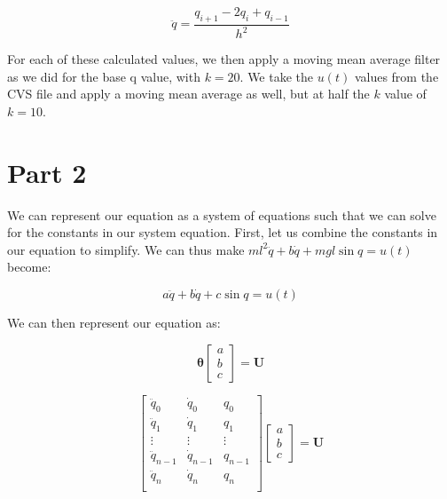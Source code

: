 \documentclass{article}
\begin{document}
\begin{equation}
    \ddot{q} = \frac{q_{i+1}-2q_i+q_{i-1}}{h^2}
\end{equation}

For each of these calculated values, we then apply a moving mean average filter as we did for the base q value, with $k=20$. We take the $u(t)$ values from the CVS file and apply a moving mean average as well, but at half the $k$ value of $k=10$.

\section*{Part 2}

We can represent our equation as a system of equations such that we can solve for the constants in our system equation. First, let us combine the constants in our equation to simplify. We can thus make $ml^2\ddot{q}+b\dot{q}+mgl\sin{q}=u(t)$ become:

\begin{equation}
    a\ddot{q}+b\dot{q}+c\sin{q}=u(t)
\end{equation}

We can then represent our equation as:

\begin{equation}
    \boldsymbol{\theta} \begin{bmatrix}
        a \\
        b \\
        c
    \end{bmatrix} = \boldsymbol{U}
\end{equation}

\begin{equation}
    \begin{bmatrix}
        \ddot{q}_0 & \dot{q}_0 & q_0 \\
        \ddot{q}_1 & \dot{q}_1 & q_1 \\
        \vdots & \vdots & \vdots \\
        \ddot{q}_{n-1} & \dot{q}_{n-1} & q_{n-1} \\
        \ddot{q}_n & \dot{q}_n & q_n \\
    \end{bmatrix}
    \begin{bmatrix}
        a \\
        b \\
        c
    \end{bmatrix} = \boldsymbol{U}
\end{equation}
\end{document}
